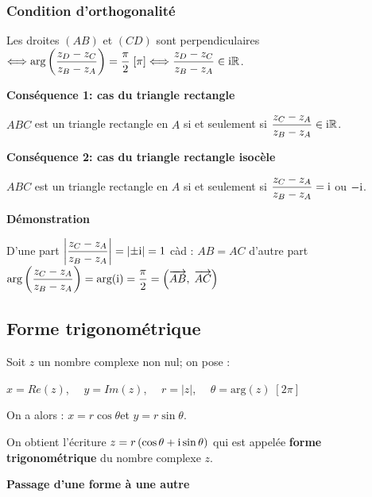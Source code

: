   \subsubsection*{Condition d'orthogonalité }
  
  Les droites $(AB) $ et $(CD) $ sont perpendiculaires  $ \Longleftrightarrow  \text{arg}\left(\dfrac{z_D - z_C}{z_B - z_A}\right) =\dfrac{\pi}{2} \; [\pi] \Longleftrightarrow \dfrac{z_D - z_C}{z_B - z_A}\in\text{i}\mathbb{R}$. 
  
  \medskip
  
  \textbf{Conséquence 1: cas du triangle rectangle }
  
  \medskip
  
  $ ABC $ est un triangle rectangle en $ A $ si et seulement si   $ \dfrac{z_C - z_A}{z_B - z_A} \in\text{i}\mathbb{R} $.
  \medskip
  
  \textbf{Conséquence 2: cas du triangle rectangle  isocèle}
  
  \medskip
  
   $ ABC $ est un triangle rectangle en $ A $ si et seulement si   $ \dfrac{z_C - z_A}{z_B - z_A} =\text{i} $  ou $ -\text{i} $.
   
   
 \bigskip
 
 \textbf{Démonstration}
 
  \medskip
  
 D'une part  $\left\lvert  \dfrac{z_C - z_A}{z_B - z_A}  \right\rvert=\left\lvert \pm \text{i} \right\rvert =1 $  càd : $ AB=AC $
  \;  d'autre part $ \text{arg}\left(\dfrac{z_C - z_A}{z_B - z_A}\right) = \text{arg}(\text{i})=\dfrac{\pi}{2}=\left( \overrightarrow{AB},\;\overrightarrow{AC} \right) $
  
 \subsection*{Forme trigonométrique}
  \begin{definition}
  Soit $ z $ un nombre complexe non nul; on pose :
  \medskip
  
  $ x=Re(z) $, $\quad y=Im(z) $, $ \quad r=|z| $, $\quad \theta=\text{arg}(z)\;[2\pi] $
  
  \medskip
  
  On a alors :\;  $ x=r \cos \theta $\quad et \quad $ y= r\sin \theta $.
 
  
  On obtient l'écriture   $ z= r\left(\cos \theta +\text{i} \sin \theta\right)$ qui est appelée \textbf{forme trigonométrique} du nombre complexe $ z $.
   \end{definition}
  \medskip
  
  \textbf{Passage d'une forme à une autre }
  
